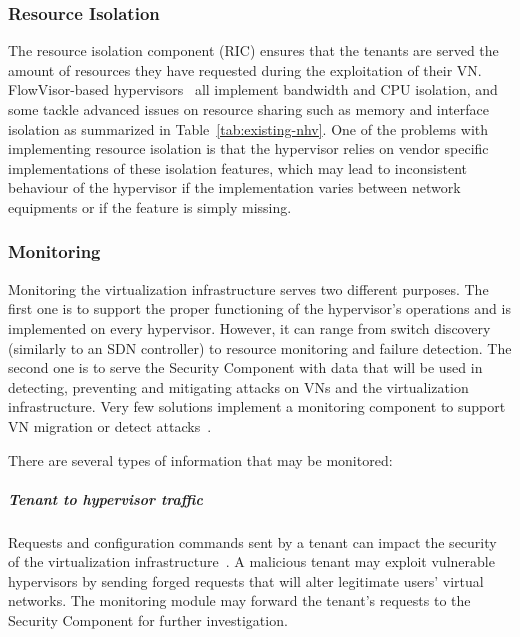 \subsubsection{Resource Isolation}
The resource isolation component (RIC) ensures that the tenants are served the amount of resources they have requested during the exploitation of their VN.
FlowVisor-based hypervisors~\cite{FlowVisor-Sherwood2009,ADVisor-Salvadori2012,VeRTIGO-Corin2012a,EnhancedFV-Min2012,SlicesIsolator-El-Azzab2011,DoubleFV-Yin2013} all implement bandwidth and CPU isolation, and some tackle advanced issues on resource sharing such as memory and interface isolation as summarized in Table~\ref{tab:existing-nhv}. One of the problems with implementing resource isolation is that the hypervisor relies on vendor specific implementations of these isolation features, which may lead to inconsistent behaviour of the hypervisor if the implementation varies between network equipments or if the feature is simply missing.


\subsubsection{Monitoring}
Monitoring the virtualization infrastructure serves two different purposes.
The first one is to support the proper functioning of the hypervisor's operations and is implemented on every hypervisor. However, it can range from switch discovery (similarly to an SDN controller) to resource monitoring and failure detection.
The second one is to serve the Security Component with data that will be used in detecting, preventing and mitigating attacks on VNs and the virtualization infrastructure.
Very few solutions implement a monitoring component to support VN migration or detect attacks~\cite{VeRTIGO-Corin2012a,CoVisor-Jin2015,FlowN-Drutskoy2012,AutoSlice-Bozakov2012,NVP-Koponen2014,ONVisor-Han2018}.

There are several types of information that may be monitored:

\subparagraph{Tenant to hypervisor traffic} Requests and configuration commands sent by a tenant can impact the security of the virtualization infrastructure~\cite{You2014,Costa2015}. A malicious tenant may exploit vulnerable hypervisors by sending forged requests that will alter legitimate users' virtual networks. The monitoring module may forward the tenant's requests to the Security Component for further investigation.

